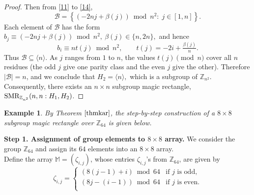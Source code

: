 \documentclass[preprint,11pt]{elsarticle}
\newcommand{\SMR}{\textnormal{SMR}}
\newtheorem{example}[theorem]{Example}
\begin{document}
\begin{proof}
Then from \eqref{11} to \eqref{14},
\[
\mathcal{B}
=
\left\{
(-2nj+\beta(j)) \bmod n^{2}
:\;
j\in[1,n]
\right\}.
\] \noindent Each element of $\mathcal{B}$ has the form 
$
b_j \equiv (-2nj + \beta(j))\bmod{n^2}, ~\beta(j)\in\{n,2n\},
$ and hence 
\[
b_i \equiv n t(j) \bmod{n^2}, 
\qquad t(j)=-2i+\tfrac{\beta(j)}{n}.
\]
Thus $\mathcal{B}\subseteq \langle n\rangle$. 
As $j$ ranges from $1$ to $n$, the values $t(j)\pmod n$ cover all $n$ residues 
(the odd $j$ give one parity class and the even $j$ give the other). 
Therefore $|\mathcal{B}|=n$, and we conclude that
\(
H_2 = \langle n \rangle,
\)
which is a subgroup of $\mathbb{Z}_{n^2}$.
 Consequently, there exists an $n \times n$ subgroup magic rectangle, $\SMR_{\mathbb{Z}_{n^2}}(n,n:H_1, H_2)$. 
\end{proof}
\begin{example}\label{ex} By  
Theorem $\ref{thmkar}$, the step-by-step construction of a $8\times 8$ subgroup magic rectangle over $\mathbb{Z}_{64}$ is given below. 
\end{example}
\noindent  \textbf{Step 1. Assignment of group elements to $8\times 8$ array.}  
We consider the group $\mathbb{Z}_{64}$ and assign its $64$ elements  
into an $8 \times 8$ array. \\  Define the array $\mathbb{M}=(\zeta_{i,j})$, whose  entries $\zeta_{i,j}$'s from $\mathbb{Z}_{64}$, are given by 
\[\zeta_{i,j}=\begin{cases}
(8(j-1)+i)\bmod{64} & \text{if~} j \text{~is odd,}\\
(8j-(i-1))\bmod{64} & \text{if~}j \text{~is even.}\\
\end{cases}\] 
\end{document}
